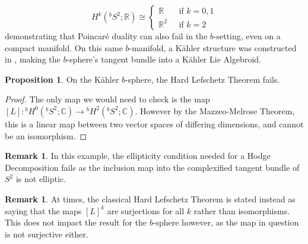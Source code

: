 \documentclass{amsart}
\newcommand{\R}{\mathbb{R}}
\newcommand{\C}{\mathbb{C}}
\newcommand{\ra}{\rightarrow}
\theoremstyle{definition}
\newtheorem{prop}[theorem]{Proposition}
\newtheorem{remark}[theorem]{Remark}
\theoremstyle{definition}
\begin{document}
\begin{equation*}
    H^k({}^bS^2;\R) \cong \begin{cases}
        \R \quad &\text{if }k=0,1 \\
        \R^2 &\text{if }k=2
    \end{cases}
\end{equation*}
demonstrating that Poincar\'e duality can also fail in the $b$-setting, even on a compact manifold. On this same $b$-manifold, a Kähler structure was constructed in \cite[Section 3.4]{MR4722602}, making the $b$-sphere's tangent bundle into a Kähler Lie Algebroid.
\begin{prop}
    On the Kähler $b$-sphere, the Hard Lefschetz Theorem fails.
\end{prop}
\begin{proof}
   The only map we would need to check is the map $[L]:{}^bH^0({}^bS^2;\C) \ra {}^bH^2({}^bS^2;\C)$. However by the Mazzeo-Melrose Theorem, this is a linear map between two vector spaces of differing dimensions, and cannot be an isomorphism.
\end{proof}
\begin{remark}
    In this example, the ellipticity condition needed for a Hodge Decomposition fails as the inclusion map into the complexified tangent bundle of $S^2$ is not elliptic.
\end{remark}
\begin{remark}
At times, the classical Hard Lefschetz Theorem is stated instead as saying that the maps $[L]^k$ are surjections for all $k$ rather than isomorphisms. This does not impact the result for the $b$-sphere however, as the map in question is not surjective either. 
\end{remark}


\end{document}
